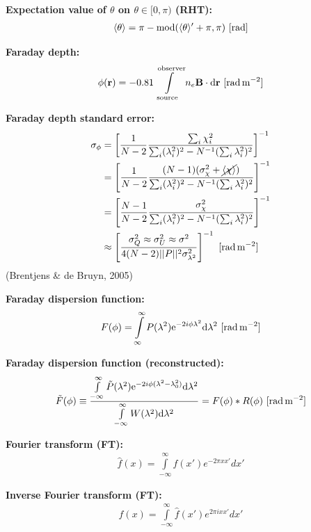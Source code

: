 \documentclass[a4paper,11pt]{article}
\begin{document}
{\noindent}\textbf{Expectation value of $\theta$ on $\theta\in[0,\pi)$ (RHT):}
\begin{align*}
    \langle\theta\rangle = \pi - {\rm mod}(\langle\theta\rangle'+\pi,\pi) ~ [{\rm rad}]
\end{align*}

{\noindent}\textbf{Faraday depth:} 
\begin{align*}
\phi(\mathbf{r}) = -0.81 \int\limits_\mathrm{source}^\mathrm{observer}n_e\mathbf{B}\cdot \mathrm{d}\mathbf{r} ~ [{\rm rad\,m^{-2}}]
\end{align*}

{\noindent}\textbf{Faraday depth standard error:}
\begin{align*}
\sigma_\phi &= \left[ \dfrac{1}{N-2} \dfrac{\sum_i\chi_i^2}{\sum_i(\lambda_i^2)^2 - N^{-1}(\sum_i\lambda_i^2)^2} \right]^{-1} \\
&= \left[ \dfrac{1}{N-2} \dfrac{(N-1)(\sigma_\chi^2 + \cancel{\langle\chi\rangle})}{\sum_i(\lambda_i^2)^2 - N^{-1}(\sum_i\lambda_i^2)^2} \right]^{-1} \\
&= \left[ \dfrac{N-1}{N-2} \dfrac{\sigma_\chi^2}{\sum_i(\lambda_i^2)^2 - N^{-1}(\sum_i\lambda_i^2)^2} \right]^{-1} \\
&\approx \left[ \dfrac{\sigma_Q^2\approx\sigma_U^2\approx\sigma^2}{4(N-2)\lvert\lvert P \rvert\rvert^2\sigma_{\lambda^2}^2} \right]^{-1} ~ [{\rm rad\,m^{-2}}]
\end{align*}
(Brentjens \& de Bruyn, 2005)

{\noindent}\textbf{Faraday dispersion function:}
\begin{align*}
F(\phi) = \int\limits_{\infty}^\infty P(\lambda^2)\mathrm{e}^{-2i\phi\lambda^2}\mathrm{d}\lambda^2 ~ [{\rm rad\,m^{-2}}]
\end{align*}

{\noindent}\textbf{Faraday dispersion function (reconstructed):}
\begin{align*}
\tilde{F}(\phi) \equiv \dfrac{\int\limits_{-\infty}^\infty \tilde{P}(\lambda^2)\mathrm{e}^{-2i\phi(\lambda^2-\lambda_0^2)}\mathrm{d}\lambda^2}{\int\limits_{-\infty}^\infty W(\lambda^2)\mathrm{d}\lambda^2} = F(\phi) * R(\phi) ~ [{\rm rad\,m^{-2}}]
\end{align*}

{\noindent}\textbf{Fourier transform (FT):}
\begin{align*}
    \hat{f}(x) = \int\limits_{-\infty}^\infty f(x')e^{-2\pi xx'}dx'
\end{align*}

{\noindent}\textbf{Inverse Fourier transform (FT):}
\begin{align*}
    f(x) = \int\limits_{-\infty}^\infty \hat{f}(x')e^{2\pi ixx'}dx'
\end{align*}
\end{document}
